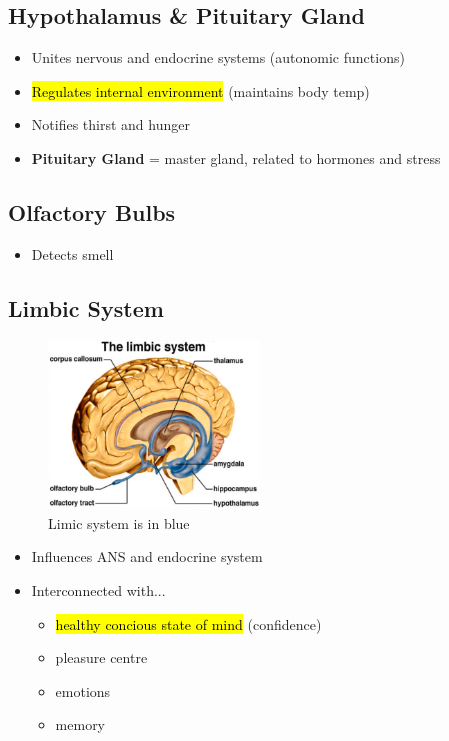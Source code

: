 \documentclass[a4paper,12pt]{article}
\begin{document}
\subsection{Hypothalamus \& Pituitary Gland}
\begin{itemize}
    \item{Unites nervous and endocrine systems (autonomic functions)}
    \item{\hl{Regulates internal environment} (maintains body temp)}
    \item{Notifies thirst and hunger}
    \item{\textbf{Pituitary Gland} = master gland, related to hormones and stress}
\end{itemize}

\subsection{Olfactory Bulbs}
\begin{itemize}
    \item{Detects smell}
\end{itemize}

\subsection{Limbic System}
\begin{figure}[H]
    \centering
    \includegraphics[width=0.50\textwidth]{limbic}
    \caption{Limic system is in blue}
\end{figure}
\begin{itemize}
    \item{Influences ANS and endocrine system}
    \item{
            Interconnected with...
            \begin{itemize}
                \item{\hl{healthy concious state of mind} (confidence)}
                \item{pleasure centre}
                \item{emotions}
                \item{memory}
            \end{itemize}
        }
\end{itemize}
\end{document}

